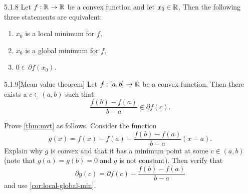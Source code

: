 \begin{manualcorollary}{5.1.8}\label{cor:local-global-min}
  Let $f : \mathbb{R} \to \mathbb{R}$ be a convex function and let $x_0 \in \mathbb{R}$.
  Then the following three statements are equivalent:
  \begin{enumerate}[label = (\emph{\roman*})]
    \item $x_0$ is a local minimum for $f$,
    \item $x_0$ is a global minimum for $f$,
    \item $0 \in \partial f(x_0)$.
  \end{enumerate}
\end{manualcorollary}

\begin{manualtheorem}{5.1.9}[Mean value theorem]\label{thm:mvt}
  Let $f : [a, b] \to \mathbb{R}$ be a convex function.
  Then there exists a $c \in (a, b)$ such that
  \begin{equation}
    \frac{f(b) - f(a)}{b - a} \in \partial f(c).
  \end{equation}
\end{manualtheorem}

\begin{exercise}
  Prove \cref{thm:mvt} as follows.
  Consider the function
  \begin{equation}
    g(x) = f(x) - f(a) - \frac{f(b) - f(a)}{b - a} (x - a).
  \end{equation}
  Explain why $g$ is convex and that it has a minimum point at some $c \in (a, b)$ (note that $g(a) = g(b) = 0$ and $g$ is not constant).
  Then verify that
  \begin{equation}
    \partial g(c) = \partial f(c) - \frac{f(b) - f(a)}{b - a}
  \end{equation}
  and use \cref{cor:local-global-min}.
\end{exercise}

